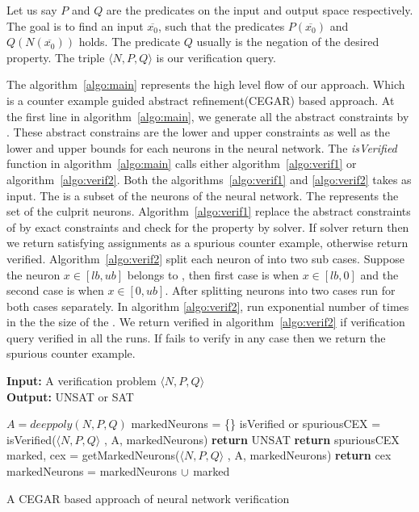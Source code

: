Let us say $P$ and $Q$ are the predicates on the input and output space respectively. 
The goal is to find an input $\overline{x_0}$, such that the predicates $P(\overline{x_0})$ and $Q(N(\overline{x_0}))$ holds. 
The predicate $Q$ usually is the negation of the desired property. The triple $\langle N, P, Q \rangle$ is our verification query. 

The algorithm~\ref{algo:main} represents the high level flow of our approach. Which is a counter example guided abstract refinement(CEGAR) based approach. 
At the first line in algorithm~\ref{algo:main}, we generate all the abstract constraints by \deeppoly{}. These abstract constrains
are the lower and upper constraints as well as the lower and upper bounds for each neurons in the neural network.
The \emph{isVerified} function in algorithm~\ref{algo:main} calls either algorithm~\ref{algo:verif1} or algorithm~\ref{algo:verif2}. 
Both the algorithms~\ref{algo:verif1} and \ref{algo:verif2} takes \markednewrons{} as input. The \markednewrons{} 
is a subset of the neurons of the neural network. The \markednewrons{} represents the set of the culprit neurons. 
Algorithm~\ref{algo:verif1} replace the abstract constraints of \markednewrons{} by exact constraints and check for the 
property by \milp{} solver. If \milp{} solver return \sat{} then we return satisfying assignments as a spurious counter example, 
otherwise return verified. Algorithm~\ref{algo:verif2} split each neuron of \markednewrons{} into two sub cases. Suppose the 
neuron $x\in [lb,ub]$ belongs to \markednewrons{}, then first case is when $x \in [lb,0]$ and the second case is when $x \in [0,ub]$.   
After splitting neurons into two cases \deeppoly{} run for both cases separately. In algorithm \ref{algo:verif2}, \deeppoly{}
run exponential number of times in the the size of the \markednewrons{}. We return verified in algorithm~\ref{algo:verif2} if 
verification query verified in all the \deeppoly{} runs. If \deeppoly{} fails to verify in any case then we return the spurious counter example. 


\begin{algorithm}[t]
  \textbf{Input: } A verification problem $\langle N,P,Q \rangle$ \\
  \textbf{Output: } UNSAT or SAT
  \begin{algorithmic}[1]
    \State $A = deeppoly(N,P,Q)$
    \State markedNeurons = \{\}
      \State isVerified or spuriousCEX = isVerified($\langle N,P,Q \rangle$ , A, markedNeurons)
        \State \textbf{return} UNSAT
      \Else
          \State \textbf{return} spuriousCEX
        \Else
          \State marked, cex = getMarkedNeurons($\langle N,P,Q \rangle$ , A, markedNeurons)
            \State \textbf{return} cex
          \EndIf
          \State markedNeurons = markedNeurons ${\cup}$ marked
        \EndIf
      \EndIf
    \EndWhile
  \end{algorithmic}
  \caption{A CEGAR based approach of neural network verification}
  \label{algo:main}
\end{algorithm}

